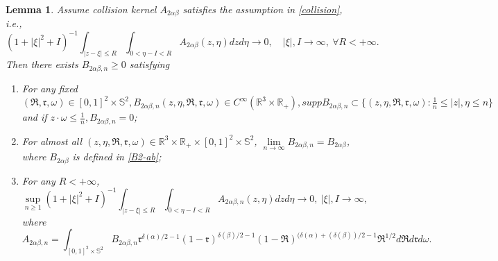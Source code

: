\documentclass[10pt,a4paper]{amsart}
\newtheorem{lemma}{Lemma}
\def\R{\mathbb{R}}
\begin{document}
	\begin{lemma}\label{Lemma 4.10}
	Assume collision kernel $A_{2\alpha \beta }$ satisfies the assumption in \eqref{collision}, i.e.,
	\begin{equation*}
		(1+|\xi|^2 + I )^{-1} \int_{|z-\xi |\leq R } \int_{0<\eta -I < R } A_{2\alpha \beta } (z,\eta ) dzd\eta \rightarrow 0, \quad |\xi|, I \rightarrow \infty , \ \forall R <+\infty .
	\end{equation*}	
	Then there exists $B_{2\alpha \beta ,n }\geq 0 $ satisfying
	\begin{enumerate}
		\item {For any fixed $(\mathfrak{R},\mathfrak{r},\omega)\in [0,1]^2 \times \mathbb{S}^2, B_{2\alpha \beta , n } (z,\eta , \mathfrak{R},\mathfrak{r},\omega ) \in C^\infty (\R^3 \times \R_+), supp B_{2\alpha \beta , n } \subset \{(z,\eta , \mathfrak{R},\mathfrak{r},\omega ): \frac{1}{n} \leq |z|,\eta \leq n \}$ and if $ z \cdot \omega \leq \frac{1}{n}, B_{2\alpha \beta , n } =0$;	}\label{1 of Lemma 4.10}
		\item  {For almost all $(z,\eta , \mathfrak{R},\mathfrak{r},\omega )\in \R^3 \times \R_+ \times [0,1]^2 \times \mathbb{S}^2$, 
  $ \lim \limits_{n\rightarrow \infty } B_{2\alpha \beta ,n } =B_{2\alpha \beta } $, where $B_{2\alpha \beta }$ is defined in \eqref{B2-ab};
  } \label{2 of Lemma 4.10}
		\item {For any $R < + \infty$,
		\begin{equation*}
		\sup \limits_{n \geq 1} (1+|\xi|^2 + I )^{-1} \int_{|z-\xi |\leq R } \int_{0<\eta -I < R } A_{2\alpha \beta ,n } (z,\eta ) dzd\eta \rightarrow 0, \ |\xi|, I \rightarrow \infty ,
		\end{equation*}	
  where 
  \begin{equation*}
    A_{2\alpha \beta ,n }=\int_{[0,1]^2 \times \mathbb{S}^2} B_{2\alpha \beta ,n } \mathfrak{r}^{\delta(\alpha)/2-1 } (1-\mathfrak{r})^{\delta(\beta )/2-1} (1-\mathfrak{R})^{(\delta(\alpha)+(\delta(\beta ))/2-1} \mathfrak{R}^{1/2}  d\mathfrak{R}d\mathfrak{r}d\omega.  
  \end{equation*} 
}\label{3 of Lemma 4.10}
	\end{enumerate}
\end{lemma}
\end{document}
